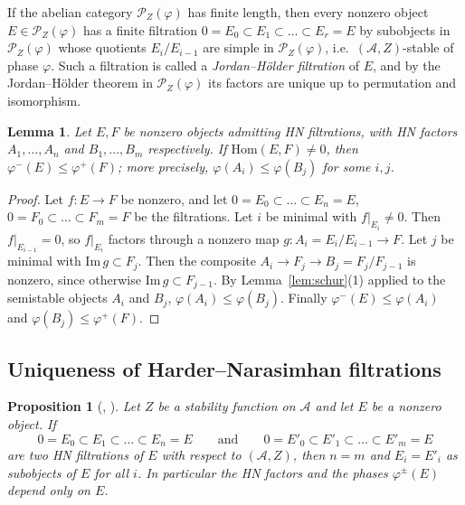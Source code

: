 \documentclass[12pt]{amsart}
\newtheorem{proposition}[theorem]{Proposition}
\newtheorem{lemma}[theorem]{Lemma}
\numberwithin{theorem}{section}
\theoremstyle{definition}
\newcommand{\calA}{\mathcal{A}}
\newcommand{\calP}{\mathcal{P}}
\newcommand{\Hom}{\mathrm{Hom}}
\newcommand{\image}{\mathrm{Im} \,}
\begin{document}
	If the abelian category $\calP_Z(\varphi)$ has finite length, then every nonzero object $E \in \calP_Z(\varphi)$ has a finite filtration $0 = E_0 \subset E_1 \subset \ldots \subset E_r = E$ by subobjects in $\calP_Z(\varphi)$ whose quotients $E_i / E_{i-1}$ are simple in $\calP_Z(\varphi)$, i.e.\ $(\calA, Z)$-stable of phase $\varphi$.
	Such a filtration is called a \emph{Jordan--H\"older filtration} of $E$, and by the Jordan--H\"older theorem in $\calP_Z(\varphi)$ its factors are unique up to permutation and isomorphism.

	
	\begin{lemma}
		\label{lem:hom_HN}
		Let $E, F$ be nonzero objects admitting HN filtrations, with HN factors $A_1, \ldots, A_n$ and $B_1, \ldots, B_m$ respectively. If $\Hom(E, F) \neq 0$, then $\varphi^-(E) \leqslant \varphi^+(F)$; more precisely, $\varphi(A_i) \leqslant \varphi(B_j)$ for some $i, j$.
	\end{lemma}
	
	\begin{proof}
		Let $f \colon E \to F$ be nonzero, and let $0 = E_0 \subset \ldots \subset E_n = E$, $0 = F_0 \subset \ldots \subset F_m = F$ be the filtrations. Let $i$ be minimal with $f|_{E_i} \neq 0$. Then $f|_{E_{i-1}} = 0$, so $f|_{E_i}$ factors through a nonzero map $g \colon A_i = E_i / E_{i-1} \to F$. Let $j$ be minimal with $\image g \subset F_j$. Then the composite $A_i \to F_j \to B_j = F_j / F_{j-1}$ is nonzero, since otherwise $\image g \subset F_{j-1}$. By Lemma~\ref{lem:schur}(1) applied to the semistable objects $A_i$ and $B_j$, $\varphi(A_i) \leqslant \varphi(B_j)$. Finally $\varphi^-(E) \leqslant \varphi(A_i)$ and $\varphi(B_j) \leqslant \varphi^+(F)$.
	\end{proof}
	
	
	\subsection{Uniqueness of Harder--Narasimhan filtrations}
	
	\begin{proposition}[{\cite[Thm~2]{Rud97}}, {\cite[Exercise~4.7]{MS17}}]
		\label{prop:HN_unique}
		Let $Z$ be a stability function on $\calA$ and let $E$ be a nonzero object. If
		\[
		0 = E_0 \subset E_1 \subset \ldots \subset E_n = E
		\qquad\text{and}\qquad
		0 = E'_0 \subset E'_1 \subset \ldots \subset E'_m = E
		\]
		are two HN filtrations of $E$ with respect to $(\calA, Z)$, then $n = m$ and $E_i = E'_i$ as subobjects of $E$ for all $i$. In particular the HN factors and the phases $\varphi^{\pm}(E)$ depend only on $E$.
	\end{proposition}
	
\end{document}
